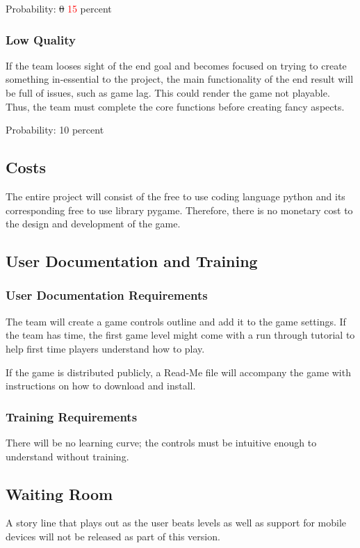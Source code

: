 \documentclass[12pt, titlepage]{article}
\begin{document}
Probability: \sout{0} \textcolor{red}{15} percent

\subsubsection{Low Quality}
If the team looses sight of the end goal and becomes focused on trying to create something in-essential to the project, the main functionality of the end result will be full of issues, such as game lag. This could render the game not playable. Thus, the team must complete the core functions before creating fancy aspects.

Probability: 10 percent

\subsection{Costs}
The entire project will consist of the free to use coding language python and its corresponding free to use library pygame. Therefore, there is no monetary cost to the design and development of the game.

\subsection{User Documentation and Training}
\subsubsection{User Documentation Requirements}
The team will create a game controls outline and add it to the game settings. If the team has time, the first game level might come with a run through tutorial to help first time players understand how to play.

If the game is distributed publicly, a Read-Me file will accompany the game with instructions on how to download and install.

\subsubsection{Training Requirements}
There will be no learning curve; the controls must be intuitive enough to understand without training.

\subsection{Waiting Room}
A story line that plays out as the user beats levels as well as support for mobile devices will not be released as part of this version.
\end{document}
